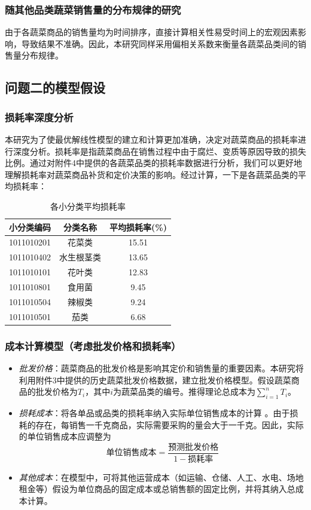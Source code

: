 \documentclass{article}
\begin{document}
\subsubsection{随其他品类蔬菜销售量的分布规律的研究}
由于各蔬菜商品的销售量均为时间排序，直接计算相关性易受时间上的宏观因素影响，导致结果不准确。因此，本研究同样采用偏相关系数来衡量各蔬菜品类间的销售量分布规律。

\subsection{问题二的模型假设}

\subsubsection{损耗率深度分析}
本研究为了使最优解线性模型的建立和计算更加准确，决定对蔬菜商品的损耗率进行深度分析。损耗率是指蔬菜商品在销售过程中由于腐烂、变质等原因导致的损失比例。通过对附件4中提供的各蔬菜品类的损耗率数据进行分析，我们可以更好地理解损耗率对蔬菜商品补货和定价决策的影响。经过计算，一下是各蔬菜品类的平均损耗率：
\begin{table}[H]
\centering
\caption{各小分类平均损耗率}
\begin{tabular}{|c|c|c|}
\hline
小分类编码 & 分类名称 & 平均损耗率(\%) \\
\hline
1011010201 & 花菜类 & 15.51 \\
1011010402 & 水生根茎类 & 13.65 \\
1011010101 & 花叶类 & 12.83 \\
1011010801 & 食用菌 & 9.45 \\
1011010504 & 辣椒类 & 9.24 \\
1011010501 & 茄类 & 6.68\\
\hline
\end{tabular}
\end{table}

\subsubsection{成本计算模型（考虑批发价格和损耗率）}
\begin{itemize}
    \item \textit{批发价格}：蔬菜商品的批发价格是影响其定价和销售量的重要因素。本研究将利用附件3中提供的历史蔬菜批发价格数据，建立批发价格模型。假设蔬菜商品的批发价格为$T_i$，其中$i$为蔬菜品类的编号。推得理论总成本为$\sum_{i=1}^{n} T_i $。
    \item \textit{损耗成本}：将各单品或品类的损耗率纳入实际单位销售成本的计算 。由于损耗的存在，每销售一千克商品，实际需要采购的量会大于一千克。因此，实际的单位销售成本应调整为 
    \[
    \text{单位销售成本} = \frac{\text{预测批发价格}}{1 - \text{损耗率}}
    \]
    \item \textit{其他成本}：在模型中，可将其他运营成本（如运输、仓储、人工、水电、场地租金等）假设为单位商品的固定成本或总销售额的固定比例，并将其纳入总成本计算。
\end{itemize}
\end{document}
